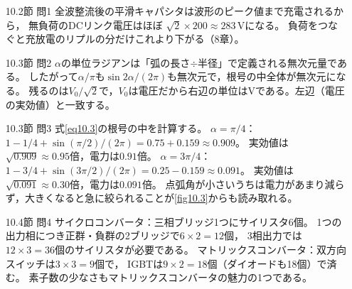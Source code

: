 \answer
\begin{enumerate}

\item[10.2節 問1]
全波整流後の平滑キャパシタは波形のピーク値まで充電されるから，
無負荷のDCリンク電圧はほぼ
$\sqrt{2} \times 200 \approx 283$\,Vになる。
負荷をつなぐと充放電のリプルの分だけこれより下がる（8章）。

\item[10.3節 問2]
$\alpha$の単位ラジアンは「弧の長さ$\div$半径」で定義される無次元量である。
したがって$\alpha/\pi$も$\sin 2\alpha/(2\pi)$も無次元で，根号の中全体が無次元になる。
残るのは$V_0/\sqrt{2}$で，$V_0$は電圧だから右辺の単位はVである。左辺（電圧の実効値）と一致する。

\item[10.3節 問3]
式\ref{eq10.3}の根号の中を計算する。
$\alpha = \pi/4$：$1 - 1/4 + \sin(\pi/2)/(2\pi) = 0.75 + 0.159 \approx 0.909$。
実効値は$\sqrt{0.909} \approx 0.95$倍，電力は$0.91$倍。
$\alpha = 3\pi/4$：$1 - 3/4 + \sin(3\pi/2)/(2\pi) = 0.25 - 0.159 \approx 0.091$。
実効値は$\sqrt{0.091} \approx 0.30$倍，電力は$0.091$倍。
点弧角が小さいうちは電力があまり減らず，大きくなると急に絞られることが\ref{fig10.3}からも読み取れる。

\item[10.4節 問4]
サイクロコンバータ：三相ブリッジ1つにサイリスタ6個。
1つの出力相につき正群・負群の2ブリッジで$6 \times 2 = 12$個，
3相出力では$12 \times 3 = 36$個のサイリスタが必要である。
マトリックスコンバータ：双方向スイッチは$3 \times 3 = 9$個で，
IGBTは$9 \times 2 = 18$個（ダイオードも18個）で済む。
素子数の少なさもマトリックスコンバータの魅力の1つである。
\end{enumerate}

